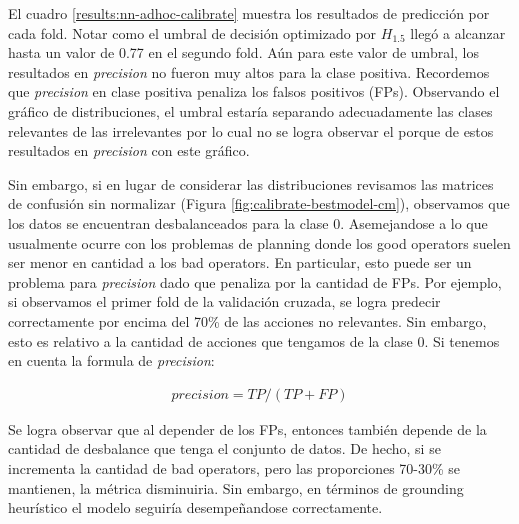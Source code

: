 El cuadro \ref{results:nn-adhoc-calibrate} muestra los resultados de predicción
por cada fold. Notar como el umbral de decisión optimizado por $H_{1.5}$ llegó a
alcanzar hasta un valor de 0.77 en el segundo fold. Aún para este valor de
umbral, los resultados en \emph{precision} no fueron muy altos para la clase
positiva. Recordemos que \emph{precision} en clase positiva penaliza los
falsos positivos (FPs). Observando el gráfico de distribuciones, el umbral
estaría separando adecuadamente las clases relevantes de las irrelevantes por lo
cual no se logra observar el porque de estos resultados en \emph{precision} con
este gráfico.

Sin embargo, si en lugar de considerar las distribuciones revisamos las matrices
de confusión sin normalizar (Figura \ref{fig:calibrate-bestmodel-cm}),
observamos que los datos se encuentran desbalanceados para la clase 0.
Asemejandose a lo que usualmente ocurre con los problemas de planning donde los
good operators suelen ser menor en cantidad a los bad operators. En particular,
esto puede ser un problema para \emph{precision} dado que penaliza por la
cantidad de FPs. Por ejemplo, si observamos el primer fold de la validación
cruzada, se logra predecir correctamente por encima del 70\% de las acciones no
relevantes. Sin embargo, esto es relativo a la cantidad de acciones que tengamos
de la clase 0. Si tenemos en cuenta la formula de \emph{precision}:

\begin{align*}
    precision = TP / (TP + FP)
\end{align*}

Se logra observar que al depender de los FPs, entonces también depende de la
cantidad de desbalance que tenga el conjunto de datos. De hecho, si se
incrementa la cantidad de bad operators, pero las proporciones 70-30\% se
mantienen, la métrica disminuiria. Sin embargo, en términos de grounding
heurístico el modelo seguiría desempeñandose correctamente.

